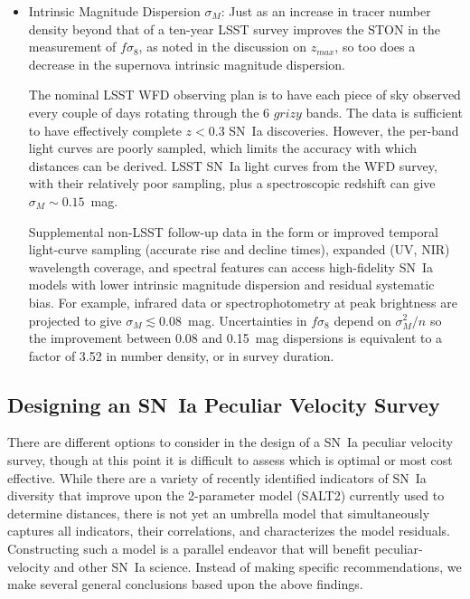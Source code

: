 \documentclass{aastex62}   	%
\begin{document}
\begin{itemize}
\item Intrinsic Magnitude Dispersion $\sigma_M$:
Just as an increase in tracer number density beyond that of a ten-year LSST survey improves the STON in the measurement
of $f\sigma_8$, as noted in the discussion on $z_{max}$, so too does a decrease in the supernova intrinsic magnitude dispersion.

The nominal LSST WFD observing plan is to have
each piece of sky observed every couple of days rotating through the 6 $grizy$ bands. The data is sufficient to have effectively
complete $z<0.3$ SN~Ia discoveries.  However,  the per-band light curves are poorly sampled, which limits the accuracy with which distances
can be derived.
LSST SN~Ia light curves from the WFD survey, with their relatively poor sampling, plus a spectroscopic redshift
 can give $\sigma_M \sim 0.15$~mag.
 
Supplemental non-LSST follow-up data in the form or improved temporal light-curve sampling (accurate rise and decline times), 
expanded (UV, NIR) wavelength coverage, and spectral features
can access high-fidelity SN~Ia models with lower intrinsic magnitude dispersion and residual systematic bias.
For example, infrared data \citep{2012MNRAS.425.1007B} or spectrophotometry at peak brightness
 \citep{2015ApJ...815...58F} are projected to give
$\sigma_M \lesssim 0.08$~mag.
Uncertainties in $f\sigma_8$ depend on $\sigma^2_M/n$ so the improvement between 0.08 and 0.15~mag dispersions is equivalent to a factor of 3.52
 in number density, or in survey duration. 
\end{itemize}

\subsection{Designing an SN~Ia Peculiar Velocity Survey}
There are different options to consider in the design of a SN~Ia peculiar velocity survey, though at this point it is difficult to assess which is optimal
or most cost effective.  While there are a variety
of recently identified indicators of SN~Ia diversity that improve upon the 2-parameter model (SALT2) currently used to determine distances, 
there is not yet an umbrella model that simultaneously captures all indicators, their correlations, and characterizes the model residuals.
Constructing such a model is a parallel
endeavor that will benefit peculiar-velocity  and other SN~Ia science.  Instead of making specific recommendations, we make several general conclusions
based upon the above findings.
\end{document}
